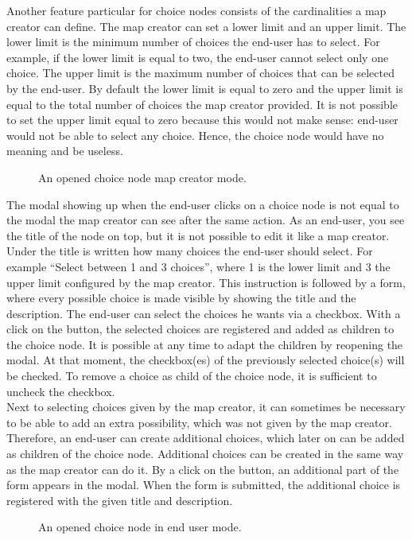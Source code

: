 Another feature particular for choice nodes consists of the cardinalities a map creator can define. The map creator can set a lower limit and an upper limit. The lower limit is the minimum number of choices the end-user has to select. For example, if the lower limit is equal to two, the end-user cannot select only one choice. The upper limit is the maximum number of choices that can be selected by the end-user. By default the lower limit is equal to zero and the upper limit is equal to the total number of choices the map creator provided. It is not possible to set the upper limit equal to zero because this would not make sense: end-user would not be able to select any choice. Hence, the choice node would have no meaning and be useless.
\begin{figure}[H]
	\centering
	\caption{An opened choice node map creator mode.}
	\label{fig:gm-choicenode-mapcreator}
\end{figure}

The modal showing up when the end-user clicks on a choice node is not equal to the modal the map creator can see after the same action. As an end-user, you see the title of the node on top, but it is not possible to edit it like a map creator. Under the title is written how many choices the end-user should select. For example ``Select between 1 and 3 choices'', where 1 is the lower limit and 3 the upper limit configured by the map creator. This instruction is followed by a form, where every possible choice is made visible by showing the title and the description. The end-user can select the choices he wants via a checkbox. With a click on the button, the selected choices are registered and added as children to the choice node. It is possible at any time to adapt the children by reopening the modal. At that moment, the checkbox(es) of the previously selected choice(s) will be checked. To remove a choice as child of the choice node, it is sufficient to uncheck the checkbox.\\

Next to selecting choices given by the map creator, it can sometimes be necessary to be able to add an extra possibility, which was not given by the map creator. Therefore, an end-user can create additional choices, which later on can be added as children of the choice node. Additional choices can be created in the same way as the map creator can do it. By a click on the button, an additional part of the form appears in the modal. When the form is submitted, the additional choice is registered with the given title and description.
\begin{figure}[H]
	\centering
	\caption{An opened choice node in end user mode.}
	\label{fig:gm-choicenode-enduser}
\end{figure}





